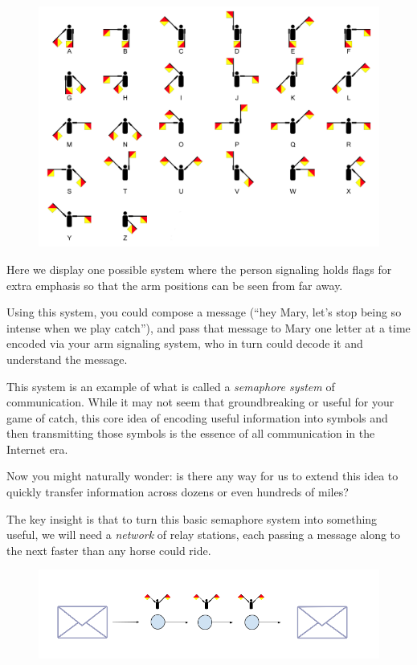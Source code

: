 \documentclass[UTF8]{book}
\begin{document}
\begin{CJK}{UTF8}{gbsn}
\begin{figure}[H]
\centering
\includegraphics[width=0.9\linewidth]{semaphoreflags3}
\end{figure}

Here we display one possible system where the person signaling holds flags for extra emphasis so that the arm positions can be seen from far away.

Using this system, you could compose a message (``hey Mary, let's stop being so intense when we play catch''), and pass that message to Mary one letter at a time encoded via your arm signaling system, who in turn could decode it and understand the message.

This system is an example of what is called a \emph{semaphore system} of communication. While it may not seem that groundbreaking or useful for your game of catch, this core idea of encoding useful information into symbols and then transmitting those symbols is the essence of all communication in the Internet era.

Now you might naturally wonder: is there any way for us to extend this idea to quickly transfer information across dozens or even hundreds of miles?

The key insight is that to turn this basic semaphore system into something useful, we will need a \emph{network} of relay stations, each passing a message along to the next faster than any horse could ride.

\begin{figure}[H]
\centering
\includegraphics[width=0.9\linewidth]{relay_stations}
\end{figure}


\end{CJK}
\end{document}
